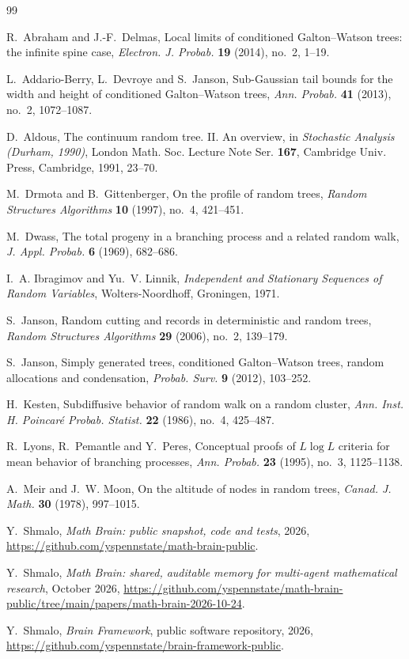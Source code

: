 \documentclass[11pt]{amsart}
\theoremstyle{remark}
\numberwithin{equation}{section}
\begin{document}
\begin{thebibliography}{99}

R.~Abraham and J.-F.~Delmas, Local limits of conditioned Galton--Watson trees: the infinite spine case, \emph{Electron. J. Probab.} \textbf{19} (2014), no.~2, 1--19.

L.~Addario-Berry, L.~Devroye and S.~Janson, Sub-Gaussian tail bounds for the width and height of conditioned Galton--Watson trees, \emph{Ann. Probab.} \textbf{41} (2013), no.~2, 1072--1087.

D.~Aldous, The continuum random tree. II. An overview, in \emph{Stochastic Analysis (Durham, 1990)}, London Math. Soc. Lecture Note Ser. \textbf{167}, Cambridge Univ. Press, Cambridge, 1991, 23--70.

M.~Drmota and B.~Gittenberger, On the profile of random trees, \emph{Random Structures Algorithms} \textbf{10} (1997), no.~4, 421--451.

M.~Dwass, The total progeny in a branching process and a related random walk, \emph{J. Appl. Probab.} \textbf{6} (1969), 682--686.

I.~A. Ibragimov and Yu.~V. Linnik, \emph{Independent and Stationary Sequences of Random Variables}, Wolters-Noordhoff, Groningen, 1971.

S.~Janson, Random cutting and records in deterministic and random trees, \emph{Random Structures Algorithms} \textbf{29} (2006), no.~2, 139--179.

S.~Janson, Simply generated trees, conditioned Galton--Watson trees, random allocations and condensation, \emph{Probab. Surv.} \textbf{9} (2012), 103--252.

H.~Kesten, Subdiffusive behavior of random walk on a random cluster, \emph{Ann. Inst. H. Poincar\'e Probab. Statist.} \textbf{22} (1986), no.~4, 425--487.

R.~Lyons, R.~Pemantle and Y.~Peres, Conceptual proofs of $L\log L$ criteria for mean behavior of branching processes, \emph{Ann. Probab.} \textbf{23} (1995), no.~3, 1125--1138.

A.~Meir and J.~W. Moon, On the altitude of nodes in random trees, \emph{Canad. J. Math.} \textbf{30} (1978), 997--1015.

 Y.~Shmalo, \emph{Math Brain: public snapshot, code and tests}, 2026, \url{https://github.com/yspennstate/math-brain-public}.

 Y.~Shmalo, \emph{Math Brain: shared, auditable memory for multi-agent mathematical research}, October 2026, \url{https://github.com/yspennstate/math-brain-public/tree/main/papers/math-brain-2026-10-24}.

 Y.~Shmalo, \emph{Brain Framework}, public software repository, 2026, \url{https://github.com/yspennstate/brain-framework-public}.

\end{thebibliography}
\end{document}
